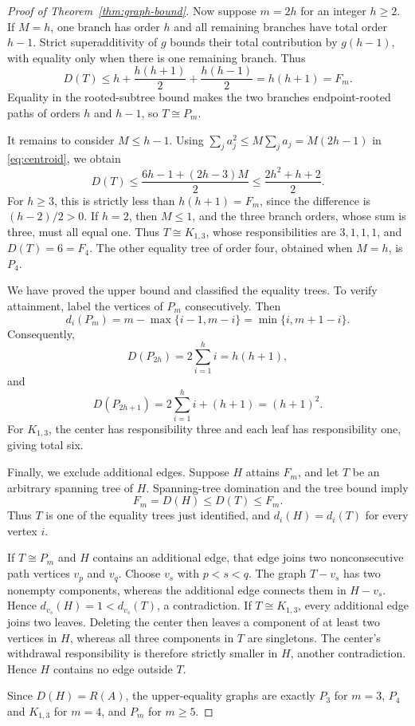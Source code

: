 \documentclass[preprint,12pt,authoryear]{elsarticle}
\begin{document}
\begin{proof}[Proof of Theorem~\ref{thm:graph-bound}]
Now suppose \(m=2h\) for an integer \(h\geq2\). If \(M=h\), one branch has order \(h\)
and all remaining branches have total order \(h-1\). Strict superadditivity of
\(g\) bounds their total contribution by \(g(h-1)\), with equality only when
there is one remaining branch. Thus
\[
 D(T)\leq h+\frac{h(h+1)}2+\frac{h(h-1)}2
 =h(h+1)=F_m.
\]
Equality in the rooted-subtree bound makes the two branches endpoint-rooted
paths of orders \(h\) and \(h-1\), so \(T\cong P_m\).

It remains to consider \(M\leq h-1\). Using
\(\sum_j a_j^2\leq M\sum_j a_j=M(2h-1)\) in
\eqref{eq:centroid}, we obtain
\[
 D(T)
 \leq\frac{6h-1+(2h-3)M}{2}
 \leq\frac{2h^2+h+2}{2}.
\]
For \(h\geq3\), this is strictly less than \(h(h+1)=F_m\), since the
difference is \((h-2)/2>0\). If \(h=2\), then \(M\leq1\), and the three
branch orders, whose sum is three, must all equal one. Thus
\(T\cong K_{1,3}\), whose responsibilities are \(3,1,1,1\), and
\(D(T)=6=F_4\). The other equality tree of order four, obtained when \(M=h\),
is \(P_4\).

We have proved the upper bound and classified the equality trees. To verify
attainment, label the vertices of \(P_m\) consecutively. Then
\[
 d_i(P_m)=m-\max\{i-1,m-i\}=\min\{i,m+1-i\}.
\]
Consequently,
\[
 D(P_{2h})=2\sum_{i=1}^h i=h(h+1),
\]
and
\[
 D(P_{2h+1})=2\sum_{i=1}^h i+(h+1)=(h+1)^2.
\]
For \(K_{1,3}\), the center has responsibility three and each leaf has
responsibility one, giving total six.

Finally, we exclude additional edges. Suppose \(H\) attains \(F_m\), and let
\(T\) be an arbitrary spanning tree of \(H\). Spanning-tree domination and the tree
bound imply
\[
 F_m=D(H)\leq D(T)\leq F_m.
\]
Thus \(T\) is one of the equality trees just identified, and
\(d_i(H)=d_i(T)\) for every vertex \(i\).

If \(T\cong P_m\) and \(H\) contains an additional edge, that edge joins two
nonconsecutive path vertices \(v_p\) and \(v_q\). Choose \(v_s\) with
\(p<s<q\). The graph \(T-v_s\) has two nonempty components, whereas the
additional edge connects them in \(H-v_s\). Hence
\(d_{v_s}(H)=1<d_{v_s}(T)\), a contradiction. If
\(T\cong K_{1,3}\), every additional edge joins two leaves. Deleting the
center then leaves a component of at least two vertices in \(H\), whereas all
three components in \(T\) are singletons. The center's withdrawal responsibility
is therefore strictly smaller in \(H\), another contradiction. Hence \(H\)
contains no
edge outside \(T\).

Since \(D(H)=R(A)\), the upper-equality graphs are exactly \(P_3\) for \(m=3\),
\(P_4\) and \(K_{1,3}\) for \(m=4\), and \(P_m\) for \(m\geq5\).
\end{proof}
\end{document}
